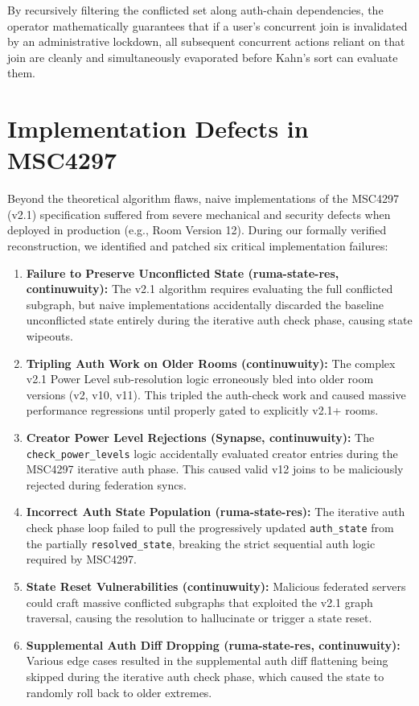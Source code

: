 \documentclass[12pt]{article}
\begin{document}
By recursively filtering the conflicted set along auth-chain dependencies, the operator mathematically guarantees that if a user's concurrent join is invalidated by an administrative lockdown, all subsequent concurrent actions reliant on that join are cleanly and simultaneously evaporated before Kahn's sort can evaluate them.

\section{Implementation Defects in MSC4297}
Beyond the theoretical algorithm flaws, naive implementations of the MSC4297 (v2.1) specification suffered from severe mechanical and security defects when deployed in production (e.g., Room Version 12). During our formally verified reconstruction, we identified and patched six critical implementation failures:

\begin{enumerate}
    \item \textbf{Failure to Preserve Unconflicted State (ruma-state-res, continuwuity):} The v2.1 algorithm requires evaluating the full conflicted subgraph, but naive implementations accidentally discarded the baseline unconflicted state entirely during the iterative auth check phase, causing state wipeouts.
    \item \textbf{Tripling Auth Work on Older Rooms (continuwuity):} The complex v2.1 Power Level sub-resolution logic erroneously bled into older room versions (v2, v10, v11). This tripled the auth-check work and caused massive performance regressions until properly gated to explicitly v2.1+ rooms.
    \item \textbf{Creator Power Level Rejections (Synapse, continuwuity):} The \texttt{check\_power\_levels} logic accidentally evaluated creator entries during the MSC4297 iterative auth phase. This caused valid v12 joins to be maliciously rejected during federation syncs.
    \item \textbf{Incorrect Auth State Population (ruma-state-res):} The iterative auth check phase loop failed to pull the progressively updated \texttt{auth\_state} from the partially \texttt{resolved\_state}, breaking the strict sequential auth logic required by MSC4297.
    \item \textbf{State Reset Vulnerabilities (continuwuity):} Malicious federated servers could craft massive conflicted subgraphs that exploited the v2.1 graph traversal, causing the resolution to hallucinate or trigger a state reset.
    \item \textbf{Supplemental Auth Diff Dropping (ruma-state-res, continuwuity):} Various edge cases resulted in the supplemental auth diff flattening being skipped during the iterative auth check phase, which caused the state to randomly roll back to older extremes.
\end{enumerate}
\end{document}
